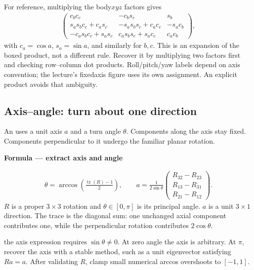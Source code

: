 \documentclass[letterpaper,11pt,english,openany,oneside]{jupyterBook}
\begin{document}
\sphinxAtStartPar
For reference, multiplying the body\sphinxhyphen{}\(xyz\) factors gives
\begin{equation*}
\begin{split}
\begin{pmatrix}
c_bc_c&-c_bs_c&s_b\\
s_as_bc_c+c_as_c&-s_as_bs_c+c_ac_c&-s_ac_b\\
-c_as_bc_c+s_as_c&c_as_bs_c+s_ac_c&c_ac_b
\end{pmatrix},
\end{split}
\end{equation*}
\sphinxAtStartPar
with \(c_a=\cos a\), \(s_a=\sin a\), and similarly for \(b,c\). This is an expansion of the boxed product, not a different rule. Recover it by multiplying two factors first and checking row–column dot products. Roll/pitch/yaw labels depend on axis convention; the lecture’s fixed\sphinxhyphen{}axis figure uses its own assignment. An explicit product avoids that ambiguity.


\subsection{Axis–angle: turn about one direction}
\label{\detokenize{lectures/lecture01/rotations:axisangle-turn-about-one-direction}}
\sphinxAtStartPar
An  uses a unit axis \(a\) and a turn angle \(\theta\). Components along the axis stay fixed. Components perpendicular to it undergo the familiar planar rotation.

\begin{TextbookBox}
\textbf{Formula — extract axis and angle}\par\smallskip
\begin{equation}\label{equation:lectures/lecture01/rotations:eq-lec01-axis-angle}
\begin{split}\theta=\arccos\!\left(\frac{\operatorname{tr}(R)-1}{2}\right),\qquad
 a=\frac{1}{2\sin\theta}\begin{pmatrix}R_{32}-R_{23}\\R_{13}-R_{31}\\R_{21}-R_{12}\end{pmatrix}.\end{split}
\end{equation}
\sphinxAtStartPar
\(R\) is a proper \(3\times3\) rotation and \(\theta\in[0,\pi]\) is its principal angle. \(a\) is a unit \(3\times1\) direction. The trace is the diagonal sum: one unchanged axial component contributes one, while the perpendicular rotation contributes \(2\cos\theta\).

\sphinxAtStartPar
{} the axis expression requires \(\sin\theta\ne0\). At zero angle the axis is arbitrary. At \(\pi\), recover the axis with a stable method, such as a unit eigenvector satisfying \(Ra=a\). After validating \(R\), clamp small numerical arccos overshoots to \([-1,1]\).

\end{TextbookBox}
\end{document}
